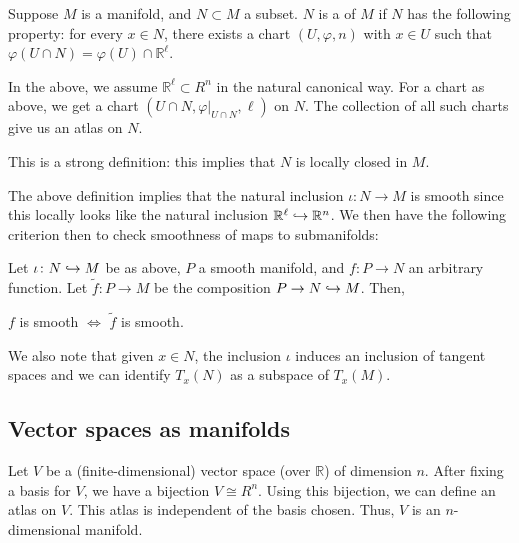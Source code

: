 \documentclass[12pt]{article}
\begin{document}
\begin{defn} \label{defn:submanifold}
	Suppose $M$ is a manifold, and $N \subset M$ a subset. $N$ is a  of $M$ if $N$ has the following property: for every $x \in N$, there exists a chart $(U, \varphi, n)$ with $x \in U$ such that $\varphi(U \cap N) = \varphi(U) \cap \mathbb{R}^{\ell}$. 
\end{defn}
\begin{rem} \label{rem:submanifold}
	In the above, we assume $\mathbb{R}^{\ell} \subset R^{n}$ in the natural canonical way. \newline
	For a chart as above, we get a chart $(U \cap N, \varphi|_{U \cap N}, \ell)$ on $N$. 
	The collection of all such charts give us an atlas on $N$.

	This is a strong definition: this implies that $N$ is locally closed in $M$.
\end{rem}

The above definition implies that the natural inclusion $\iota \colon N \to M$ is smooth since this locally looks like the natural inclusion $\mathbb{R}^{\ell} \hookrightarrow \mathbb{R}^{n}$.
We then have the following criterion then to check smoothness of maps to submanifolds:
\begin{thm} \label{thm:smoothness-into-submanifold}
	Let $\iota \colon N \hookrightarrow M$ be as above, $P$ a smooth manifold, and $f \colon P \to N$ an arbitrary function. \newline
	Let $\widetilde{f} \colon P \to M$ be the composition $P \to N \hookrightarrow M$. Then,
	\begin{center}
		$f$ is smooth $\Leftrightarrow$ $\widetilde{f}$ is smooth.
	\end{center}
\end{thm}

We also note that given $x \in N$, the inclusion $\iota$ induces an inclusion of tangent spaces and we can identify $T_{x}(N)$ as a subspace of $T_{x}(M)$.

\subsection{Vector spaces as manifolds} \label{subsec:vector-spaces-manifolds}

Let $V$ be a (finite-dimensional) vector space (over $\mathbb{R}$) of dimension $n$. 
After fixing a basis for $V$, we have a bijection $V \cong R^{n}$. 
Using this bijection, we can define an atlas on $V$. 
This atlas is independent of the basis chosen. 
Thus, $V$ is an $n$-dimensional manifold. 
\end{document}
